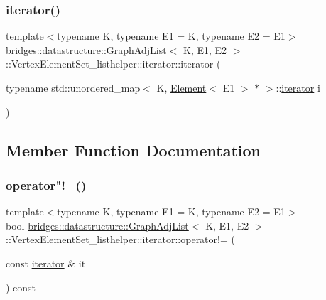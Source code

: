 \subsubsection{\texorpdfstring{iterator()}{iterator()}}
{\footnotesize\ttfamily template$<$typename K, typename E1 = K, typename E2 = E1$>$ \\
\hyperlink{classbridges_1_1datastructure_1_1_graph_adj_list}{bridges\+::datastructure\+::\+Graph\+Adj\+List}$<$ K, E1, E2 $>$\+::Vertex\+Element\+Set\+\_\+listhelper\+::iterator\+::iterator (\begin{DoxyParamCaption}\item[{typename std\+::unordered\+\_\+map$<$ K, \hyperlink{classbridges_1_1datastructure_1_1_element}{Element}$<$ E1 $>$ $\ast$ $>$\+::\hyperlink{classbridges_1_1datastructure_1_1_graph_adj_list_1_1_vertex_element_set__listhelper_1_1iterator}{iterator}}]{i }\end{DoxyParamCaption})\hspace{0.3cm}{\ttfamily [inline]}}



\subsection{Member Function Documentation}
\mbox{\label{classbridges_1_1datastructure_1_1_graph_adj_list_1_1_vertex_element_set__listhelper_1_1iterator_a1df44cf11b2aeec0c37379f6ccc9ebc0}} 
\subsubsection{\texorpdfstring{operator"!=()}{operator!=()}}
{\footnotesize\ttfamily template$<$typename K, typename E1 = K, typename E2 = E1$>$ \\
bool \hyperlink{classbridges_1_1datastructure_1_1_graph_adj_list}{bridges\+::datastructure\+::\+Graph\+Adj\+List}$<$ K, E1, E2 $>$\+::Vertex\+Element\+Set\+\_\+listhelper\+::iterator\+::operator!= (\begin{DoxyParamCaption}\item[{const \hyperlink{classbridges_1_1datastructure_1_1_graph_adj_list_1_1_vertex_element_set__listhelper_1_1iterator}{iterator} \&}]{it }\end{DoxyParamCaption}) const\hspace{0.3cm}{\ttfamily [inline]}}

